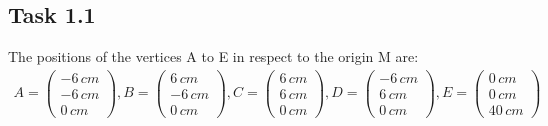 \subsection*{Task 1.1}

The positions of the vertices A to E in respect to the origin M are:
\begin{align*}
A = 
\begin{pmatrix}
- 6\,cm \\
- 6\,cm \\
0\,cm
\end{pmatrix}, 
B =
\begin{pmatrix}
  6\,cm \\
- 6\,cm \\
0\,cm
\end{pmatrix},
C =
\begin{pmatrix}
6\,cm \\
6\,cm \\
0\,cm
\end{pmatrix},
D =
\begin{pmatrix}
- 6\,cm \\
6\,cm \\
0\,cm
\end{pmatrix},
E =
\begin{pmatrix}
0\,cm \\
0\,cm \\
40\,cm
\end{pmatrix}
\end{align*}

